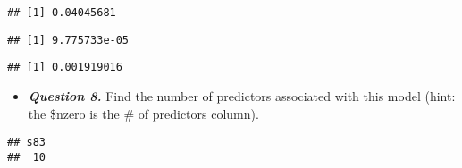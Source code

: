 \documentclass[
]{article}
\newenvironment{Shaded}{\begin{snugshade}}{\end{snugshade}}
\newcommand{\CommentTok}[1]{\textcolor[rgb]{0.56,0.35,0.01}{\textit{#1}}}
\newcommand{\FloatTok}[1]{\textcolor[rgb]{0.00,0.00,0.81}{#1}}
\newcommand{\NormalTok}[1]{#1}
\newcommand{\SpecialCharTok}[1]{\textcolor[rgb]{0.00,0.00,0.00}{#1}}
\providecommand{\tightlist}{%
  \setlength{\itemsep}{0pt}\setlength{\parskip}{0pt}}
\begin{document}
\begin{verbatim}
## [1] 0.04045681
\end{verbatim}

\begin{Shaded}
\end{Shaded}

\begin{verbatim}
## [1] 9.775733e-05
\end{verbatim}

\begin{Shaded}
\end{Shaded}

\begin{verbatim}
## [1] 0.001919016
\end{verbatim}

\begin{itemize}
\tightlist
\item
  \textbf{\emph{Question 8.}} Find the number of predictors associated
  with this model (hint: the \$nzero is the \# of predictors column).
\end{itemize}

\begin{Shaded}
\end{Shaded}

\begin{verbatim}
## s83 
##  10
\end{verbatim}

\begin{Shaded}
\end{Shaded}
\end{document}
